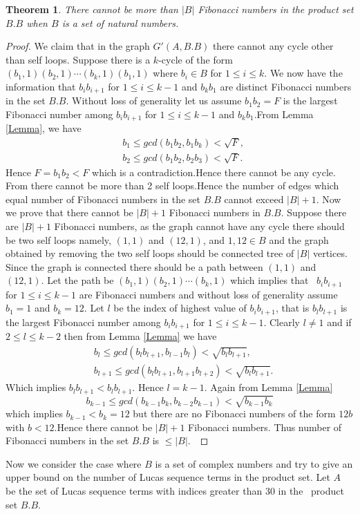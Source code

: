 \documentclass{amsart}
\newtheorem{Lemma 1}{Lemma}[section]
\newtheorem{Theorem}[Lemma 1]{Theorem}
\newtheorem{Lemma 3}[Lemma 1]{Lemma}
\newtheorem{Lucas The}[Lemma 1]{Theorem}
\newtheorem{lem 1}[Lemma 1]{Lemma}
\newtheorem{Corollary 1}[Lemma 1]{Corollary}
\newtheorem{Corollary 2}[Lemma 1]{Corollary}
\begin{document}
	\begin{Theorem}There cannot be more than $|B|$ Fibonacci numbers in the product set $B.B$ when $B$ is a set of natural numbers.\end{Theorem}\begin{proof}We claim that in the graph $G'(A,B.B)$ there cannot any cycle other than self loops. Suppose there is a $k$-cycle of the form $(b_1,1)(b_2,1)\cdots (b_k,1)(b_1,1)$ where $b_i\in B$ for $1\leq i \leq k$. We now have the information that $b_ib_{i+1}$ for $1\leq i \leq k-1$ and $b_kb_1$ are distinct Fibonacci numbers in the set $B.B$. Without loss of generality let us assume $b_1b_2=F$ is the largest Fibonacci number among $b_ib_{i+1}$ for $1\leq i \leq k-1$ and $b_kb_1$.From Lemma \ref{Lemma}, we have \begin{align*}& b_1\leq gcd(b_1b_2,b_1b_k)<\sqrt{F},\\& b_2\leq gcd(b_1b_2,b_2b_3)<\sqrt{F}.\end{align*}Hence $F=b_1b_2<F$ which is a contradiction.Hence there cannot be any cycle. From \cite{C} there cannot be more than 2 self loops.Hence the number of edges which equal number of Fibonacci numbers in the set $B.B$ cannot exceed $|B|+1$.
		Now we prove that there cannot be $|B|+1$ Fibonacci numbers in $B.B$. Suppose there are $|B|+1$ Fibonacci numbers, as the graph cannot have any cycle there should be two self loops namely, $(1,1)$ and $(12,1)$, and $1,12\in B$ and the graph obtained by removing the two self loops should be connected tree of $|B|$ vertices. Since the graph is connected there should be a path between $(1,1)$ and $(12,1)$. Let the path be $(b_1,1)(b_2,1)\cdots (b_k,1)$ which implies that  $b_ib_{i+1}$ for $1\leq i\leq k-1$ are Fibonacci numbers and without loss of generality assume $b_1=1$ and $b_k=12$. Let $l$ be the index of highest value of $b_ib_{i+1}$, that is $b_lb_{l+1}$ is the largest Fibonacci number among $b_ib_{i+1}$ for $1\leq i\leq k-1$. Clearly $l\neq 1$ and if $2\leq l\leq k-2$ then from Lemma \ref{Lemma} we have  \begin{align*}& b_l\leq gcd(b_lb_{l+1},b_{l-1}b_l)<\sqrt{b_lb_{l+1}},\\& b_{l+1}\leq gcd(b_lb_{l+1},b_{l+1}b_{l+2})<\sqrt{b_lb_{l+1}}.\end{align*}Which implies $b_lb_{l+1}<b_lb_{l+1}$. Hence $l=k-1$. Again from Lemma \ref{Lemma}\begin{equation*}b_{k-1}\leq gcd(b_{k-1}b_k,b_{k-2}b_{k-1})<\sqrt{b_{k-1}b_k}\end{equation*}which implies $b_{k-1}<b_k=12$ but there are no Fibonacci numbers of the form $12b$ with $b<12$.Hence there cannot be $|B|+1$ Fibonacci numbers. Thus number of Fibonacci numbers in the set $B.B$ is $\leq |B|$. \end{proof}Now we consider the case where $B$ is a set of complex numbers and try to give an upper bound on the number of Lucas sequence terms in the product set. Let $A$ be the set of Lucas sequence terms with indices greater than $30$ in the  product set $B.B$.   
\end{document}
